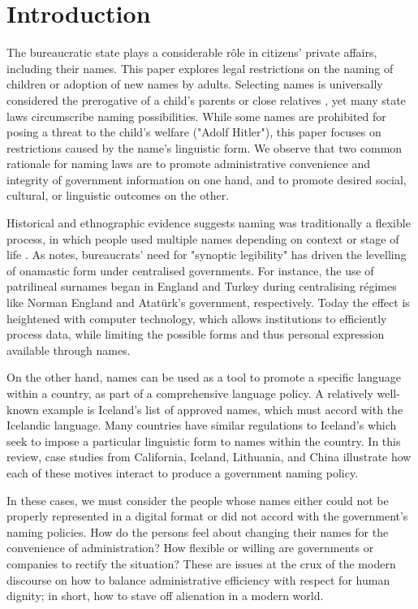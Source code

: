 \section{Introduction}

The bureaucratic state plays a considerable rôle in citizens' private affairs,
including their names. This paper explores legal restrictions on the naming of
children or adoption of new names by adults. Selecting names is universally
considered the prerogative of a child's parents or close relatives
\parencite{alford88}, yet many state laws circumscribe naming possibilities.
While some names are prohibited for posing a threat to the child's welfare
("Adolf Hitler"), this paper focuses on restrictions caused by the name's
linguistic form. We observe that two common rationale for naming laws are to
promote administrative convenience and integrity of government information on
one hand, and to promote desired social, cultural, or linguistic outcomes on the
other.

Historical and ethnographic evidence suggests naming was traditionally a
flexible process, in which people used multiple names depending on context or
stage of life \parencite{alford88} \parencite{scott02}. As \textcite{scott02}
notes, bureaucrats' need for "synoptic legibility" has driven the levelling of
onamastic form under centralised governments. For instance, the use of
patrilineal surnames began in England and Turkey during centralising régimes
like Norman England and Atatürk's government, respectively. Today the effect is
heightened with computer technology, which allows institutions to efficiently
process data, while limiting the possible forms and thus personal expression
available through names.

On the other hand, names can be used as a tool to promote a specific language
within a country, as part of a comprehensive language policy. A relatively
well-known example is Iceland's list of approved names, which must accord with
the Icelandic language. Many countries have similar regulations to Iceland's
which seek to impose a particular linguistic form to names within the country.
In this review, case studies from California, Iceland, Lithuania, and China
illustrate how each of these motives interact to produce a government naming
policy.

In these cases, we must consider the people whose names either could not be
properly represented in a digital format or did not accord with the government's
naming policies. How do the persons feel about changing their names for the
convenience of administration? How flexible or willing are governments or
companies to rectify the situation? These are issues at the crux of the modern
discourse on how to balance administrative efficiency with respect for human
dignity; in short, how to stave off alienation in a modern world.

